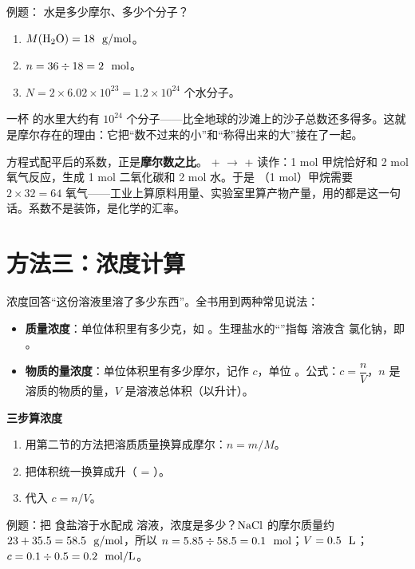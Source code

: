 例题： 水是多少摩尔、多少个分子？

\begin{enumerate}[itemsep=2pt]
\item $M(\chem{H_2O}) = 18\ \ud{}{g/mol}$。
\item $n = 36 \div 18 = 2\ \ud{}{mol}$。
\item $N = 2\times 6.02\times 10^{23} = 1.2\times 10^{24}$ 个水分子。
\end{enumerate}

一杯  的水里大约有 $10^{24}$ 个分子——比全地球的沙滩上的沙子总数还多得多。这就是摩尔存在的理由：它把“数不过来的小”和“称得出来的大”接在了一起。

\begin{qiaoliang}
方程式配平后的系数，正是\textbf{摩尔数之比}。 +  $\rightarrow$  +  读作：1 mol 甲烷恰好和 2 mol 氧气反应，生成 1 mol 二氧化碳和 2 mol 水。于是 （1 mol）甲烷需要 $2\times32=64$  氧气——工业上算原料用量、实验室里算产物产量，用的都是这一句话。系数不是装饰，是化学的汇率。
\end{qiaoliang}

\section{方法三：浓度计算}

浓度回答“这份溶液里溶了多少东西”。全书用到两种常见说法：

\begin{itemize}[itemsep=2pt]
\item \textbf{质量浓度}：单位体积里有多少克，如 。生理盐水的“”指每  溶液含  氯化钠，即 。
\item \textbf{物质的量浓度}：单位体积里有多少摩尔，记作 $c$，单位 。公式：$c = \dfrac{n}{V}$，$n$ 是溶质的物质的量，$V$ 是溶液总体积（以升计）。
\end{itemize}

\textbf{三步算浓度}

\begin{enumerate}[itemsep=2pt]
\item 用第二节的方法把溶质质量换算成摩尔：$n = m/M$。
\item 把体积统一换算成升（ = ）。
\item 代入 $c = n/V$。
\end{enumerate}

例题：把  食盐溶于水配成  溶液，浓度是多少？$\mathrm{NaCl}$ 的摩尔质量约 $23+35.5=58.5\ \ \mathrm{g/mol}$，所以 $n=5.85\div58.5=0.1\ \ \mathrm{mol}$；$V=0.5\ \ \mathrm{L}$；$c=0.1\div0.5=0.2\ \ \mathrm{mol/L}$。

